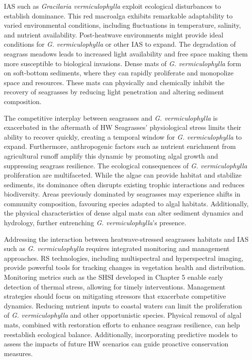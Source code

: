 \documentclass[
  letterpaper,
  11pt,
  english,
  singlespacing,
  headsepline]{MastersDoctoralThesis}
\begin{document}
\begin{spacing}{1.5}
IAS such as \emph{Gracilaria vermiculophylla} exploit ecological
disturbances to establish dominance. This red macroalga exhibits
remarkable adaptability to varied environmental conditions, including
fluctuations in temperature, salinity, and nutrient availability.
Post-heatwave environments might provide ideal conditions for \emph{G.
vermiculophylla} or other IAS to expand. The degradation of seagrass
meadows leads to increased light availability and free space making them
more susceptible to biological invasions. Dense mats of \emph{G.
vermiculophylla} form on soft-bottom sediments, where they can rapidly
proliferate and monopolize space and resources. These mats can
physically and chemically inhibit the recovery of seagrasses by reducing
light penetration and altering sediment composition.

The competitive interplay between seagrasses and \emph{G.
vermiculophylla} is exacerbated in the aftermath of HW Seagrasses'
physiological stress limits their ability to recover quickly, creating a
temporal window for \emph{G. vermiculophylla} to expand. Furthermore,
anthropogenic factors such as nutrient enrichment from agricultural
runoff amplify this dynamic by promoting algal growth and suppressing
seagrass resilience. The ecological consequences of \emph{G.
vermiculophylla} proliferation are multifaceted. While the algae can
provide habitat and stabilize sediments, its dominance often disrupts
existing trophic interactions and reduces biodiversity. Areas previously
dominated by seagrasses may experience shifts in community composition,
favouring species adapted to algal habitats. Additionally, the physical
characteristics of dense algal mats can alter sediment dynamics and
hydrology, further entrenching \emph{G. vermiculophylla}'s presence.

Addressing the interaction between heatwave-stressed seagrasses habitats
and IAS such as \emph{G. vermiculophylla} requires integrated monitoring
and management approaches. RS technologies, including multispectral and
hyperspectral imaging, provide powerful tools for tracking changes in
vegetation health and distribution. Monitoring metrics such as the SHSI
developed in Chapter 5 enable early detection of thermal stress,
allowing for timely interventions. Management strategies should focus on
mitigating stressors that exacerbate competitive dynamics. Reducing
nutrient inputs to coastal waters can limit the proliferation of
\emph{G. vermiculophylla} and other opportunistic species. Physical
removal of algal mats, combined with restoration efforts to enhance
seagrass resilience, can help reestablish ecological balance.
Additionally, incorporating predictive models to assess the impacts of
future HW scenarios can guide proactive conservation measures.


\end{spacing}
\end{document}
